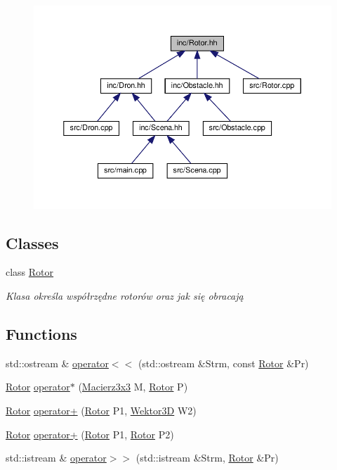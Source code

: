 \begin{figure}[H]
\begin{center}
\leavevmode
\includegraphics[width=350pt]{_rotor_8hh__dep__incl}
\end{center}
\end{figure}
\subsection*{Classes}
\begin{DoxyCompactItemize}
\item 
class \hyperlink{class_rotor}{Rotor}
\begin{DoxyCompactList}\small\item\em Klasa określa współrzędne rotorów oraz jak się obracają \end{DoxyCompactList}\end{DoxyCompactItemize}
\subsection*{Functions}
\begin{DoxyCompactItemize}
\item 
std\+::ostream \& \hyperlink{_rotor_8hh_a6e6ce3bcc6ad0cb16d457ac8d73b3a7e}{operator$<$$<$} (std\+::ostream \&Strm, const \hyperlink{class_rotor}{Rotor} \&Pr)
\item 
\hyperlink{class_rotor}{Rotor} \hyperlink{_rotor_8hh_a66cbe78735e95530c8eb1361b6fe40eb}{operator$\ast$} (\hyperlink{_macierz3x3_8hh_ad4fc7b0e263d9a99ba6174f68b52ea87}{Macierz3x3} M, \hyperlink{class_rotor}{Rotor} P)
\item 
\hyperlink{class_rotor}{Rotor} \hyperlink{_rotor_8hh_a8e627d5e28005e4dc3a7ab7ae6e21f9b}{operator+} (\hyperlink{class_rotor}{Rotor} P1, \hyperlink{_wektor3_d_8hh_ac353a272b38b4ad342f7181ad7bdb91a}{Wektor3D} W2)
\item 
\hyperlink{class_rotor}{Rotor} \hyperlink{_rotor_8hh_aec4621815bb6b2569f3c34689e7533a8}{operator+} (\hyperlink{class_rotor}{Rotor} P1, \hyperlink{class_rotor}{Rotor} P2)
\item 
std\+::istream \& \hyperlink{_rotor_8hh_a2e505b0dd49c9d2cb7fb02a9ea8ad231}{operator$>$$>$} (std\+::istream \&Strm, \hyperlink{class_rotor}{Rotor} \&Pr)
\end{DoxyCompactItemize}


